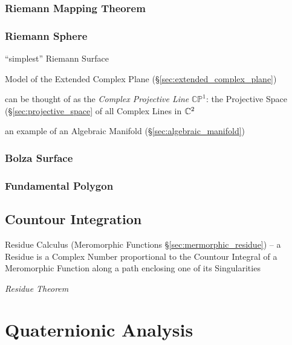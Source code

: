 \subsubsection{Riemann Mapping Theorem}
\label{sec:riemann_mapping_theorem}

\subsubsection{Riemann Sphere}\label{sec:riemann_sphere}

``simplest'' Riemann Surface

Model of the Extended Complex Plane
(\S\ref{sec:extended_complex_plane})

can be thought of as the \emph{Complex Projective Line}
$\mathbb{CP}^1$: the Projective Space (\S\ref{sec:projective_space} of
all Complex Lines in $\mathbb{C}^2$

an example of an Algebraic Manifold (\S\ref{sec:algebraic_manifold})



\subsubsection{Bolza Surface}\label{sec:bolza_surface}

\subsubsection{Fundamental Polygon}\label{sec:fundamental_polygon}



\subsection{Countour Integration}\label{sec:contour_integration}

Residue Calculus (Meromorphic Functions \S\ref{sec:mermorphic_residue}) -- a
Residue is a Complex Number proportional to the Countour Integral of a
Meromorphic Function along a path enclosing one of its Singularities

\emph{Residue Theorem}



\section{Quaternionic Analysis}\label{sec:quaternionic_analysis}

